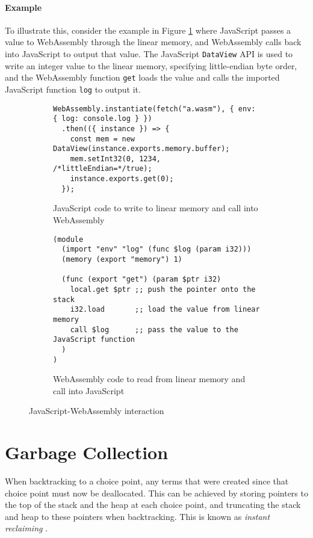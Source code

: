 \paragraph{Example} To illustrate this, consider the example in Figure \ref{fig:js-wasm} where JavaScript passes a value to WebAssembly through the linear memory, and WebAssembly calls back into JavaScript to output that value. The JavaScript \texttt{DataView} API is used to write an integer value to the linear memory, specifying little-endian byte order, and the WebAssembly function \texttt{get} loads the value and calls the imported JavaScript function \texttt{log} to output it.

\begin{figure}[H]
\centering
\begin{subfigure}{\textwidth}
\begin{verbatim}
WebAssembly.instantiate(fetch("a.wasm"), { env: { log: console.log } })
  .then(({ instance }) => {
    const mem = new DataView(instance.exports.memory.buffer);
    mem.setInt32(0, 1234, /*littleEndian=*/true);
    instance.exports.get(0);
  });
\end{verbatim}
\caption{JavaScript code to write to linear memory and call into WebAssembly}
\end{subfigure}
\par\bigskip
\par\bigskip
\begin{subfigure}{\textwidth}
\begin{verbatim}
(module
  (import "env" "log" (func $log (param i32)))
  (memory (export "memory") 1)

  (func (export "get") (param $ptr i32)
    local.get $ptr ;; push the pointer onto the stack
    i32.load       ;; load the value from linear memory
    call $log      ;; pass the value to the JavaScript function
  )
)
\end{verbatim}
\caption{WebAssembly code to read from linear memory and call into JavaScript}
\end{subfigure}
\caption{JavaScript-WebAssembly interaction}
\label{fig:js-wasm}
\end{figure}

\section{Garbage Collection}

When backtracking to a choice point, any terms that were created since that choice point must now be deallocated. This can be achieved by storing pointers to the top of the stack and the heap at each choice point, and truncating the stack and heap to these pointers when backtracking. This is known as \emph{instant reclaiming} \cite{bekkersDynamicMemoryManagement1992}.

